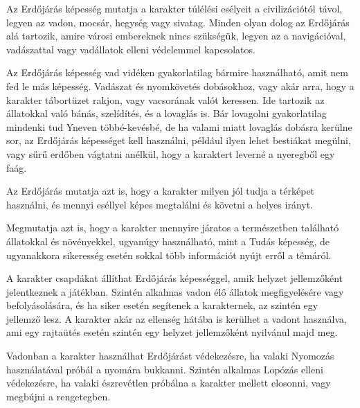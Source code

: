 
Az Erdőjárás képesség mutatja a karakter túlélési esélyeit a civilizációtól távol, legyen az vadon, mocsár, hegység vagy sivatag. Minden olyan dolog az Erdőjárás alá tartozik, amire városi embereknek nincs szükségük, legyen az a navigációval, vadászattal vagy vadállatok elleni védelemmel kapcsolatos.

\overcome Az Erdőjárás képesség vad vidéken gyakorlatilag bármire használható, amit nem fed le más képesség. Vadászat és nyomkövetés dobásokhoz, vagy akár arra, hogy a karakter tábortüzet rakjon, vagy vacsorának valót keressen. Ide tartozik az állatokkal való bánás, szelídítés, és a lovaglás is. Bár lovagolni gyakorlatilag mindenki tud Yneven többé-kevésbé, de ha valami miatt lovaglás dobásra kerülne sor, az Erdőjárás képességet kell használni, például ilyen lehet bestiákat megülni, vagy sűrű erdőben vágtatni anélkül, hogy a karaktert leverné a nyeregből egy faág.

Az Erdőjárás mutatja azt is, hogy a karakter milyen jól tudja a térképet használni, és mennyi eséllyel képes megtalálni és követni a helyes irányt.

Megmutatja azt is, hogy a karakter mennyire járatos a természetben található állatokkal és növényekkel, ugyanúgy használható, mint a Tudás képesség, de ugyanakkora sikeresség esetén sokkal több információt nyújt erről a témáról.

\advantage A karakter csapdákat állíthat Erdőjárás képességgel, amik helyzet jellemzőként jelentkeznek a játékban. Szintén alkalmas vadon élő állatok megfigyelésére vagy befolyásolására, és ha siker esetén segítenek a karakternek, az szintén egy jellemző lesz. A karakter akár az ellenség hátába is kerülhet a vadont használva, ami egy rajtaütés esetén szintén egy helyzet jellemzőként nyilvánul majd meg.

\noattackatall
 
 Vadonban a karakter használhat Erdőjárást védekezésre, ha valaki Nyomozás használatával próbál a nyomára bukkanni. Szintén alkalmas Lopózás elleni védekezésre, ha valaki észrevétlen próbálna a karakter mellett elosonni, vagy megbújni a rengetegben.



